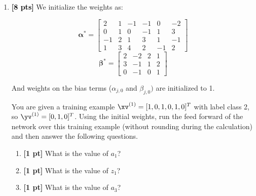 \begin{enumerate}
\item \textcolor{black}{\textbf{[8 pts]}}
     We initialize the weights as:
\begin{center}
$$\boldsymbol{\alpha^*}=
    \begin{bmatrix}
    2 & 1 & -1 & -1 & 0 & -2 \\
    0 & 1 & 0 & -1 & 1 & 3 \\
    -1 & 2 & 1 & 3 & 1 & -1 \\
    1 & 3 & 4 & 2 & -1 & 2
    \end{bmatrix}$$
$$\boldsymbol{\beta^*}=
    \begin{bmatrix}
    2 & -2 & 2 & 1 \\
    3 & -1 & 1 & 2 \\
    0 & -1 & 0 & 1
    \end{bmatrix}
$$
\end{center}
    
And weights on the bias terms (${\alpha}_{j,0}$ and ${\beta}_{j,0})$ are initialized to 1.
    
    You are given a training example $\xv^{(1)}=[1,0,1,0,1,0]^T$ with label class 2, so $\yv^{(1)}=[0,1,0]^T$. Using the initial weights, run the feed forward of the network over this training example (without rounding during the calculation) and then answer the following questions. 
    
    \begin{enumerate}
        \item \textbf{[1 pt]} What is the value of $a_1$?
        
        \begin{tcolorbox}[fit,height=1cm, width=2cm, blank, borderline={1pt}{-2pt}]
        \end{tcolorbox}
        
        
        \item \textbf{[1 pt]} What is the value of $z_1$?
        
        \begin{tcolorbox}[fit,height=1cm, width=2cm, blank, borderline={1pt}{-2pt}]
        \end{tcolorbox}

        
        \item \textbf{[1 pt]} What is the value of $a_3$?
        
        \begin{tcolorbox}[fit,height=1cm, width=2cm, blank, borderline={1pt}{-2pt}]
        \end{tcolorbox}
        

\end{enumerate}
\end{enumerate}
